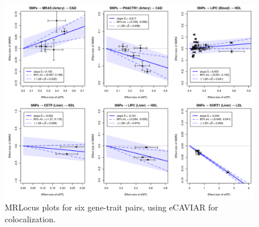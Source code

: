 \documentclass[11pt]{article}
\begin{document}
\begin{figure}[!ht]
  \centering
  \includegraphics[width=\textwidth]{figs/real_loci_ecav-mrlocus.png}
  \caption{MRLocus plots for six gene-trait pairs, using eCAVIAR for colocalization.}
\end{figure}
\end{document}
